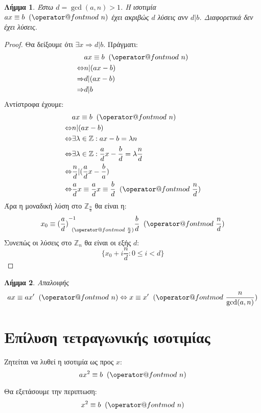 \documentclass[11pt,a4paper]{book}
\makeatletter
\newtheorem*{lemma}{Λήμμα}
\def\imod#1{\allowbreak\mkern10mu({\operator@font mod}\,\,#1)}
\makeatother
\begin{document}
\begin{lemma}
Έστω $d = \gcd( a, n ) > 1$. Η ισοτιμία $ax \equiv b \imod n$ έχει ακριβώς $d$ λύσεις ανν $d|b$. Διαφορετικά δεν έχει λύσεις.
\end{lemma}
\begin{proof}
Θα δείξουμε ότι $\exists x \Rightarrow d|b$. Πράγματι:
\begin{align*}
& ax \equiv b \imod n \\
\Leftrightarrow & n | (ax - b)\\
\Rightarrow & d|(ax-b)\\
\Rightarrow & d|b
\end{align*}
Αντίστροφα έχουμε:
\begin{align*}
& ax \equiv b \imod n\\
\Leftrightarrow & n | (ax - b)\\
\Leftrightarrow & \exists \lambda \in \mathbb{Z}: ax - b = \lambda n\\
\Leftrightarrow & \exists \lambda \in \mathbb{Z}: \frac{a}{d}x - \frac{b}{d} = \lambda\frac{n}{d} \\
\Leftrightarrow & \frac{n}{d} | (\frac{a}{d}x - \frac{b}{a}) \\
\Leftrightarrow & \frac{a}{d}x \equiv \frac{a}{d}x \equiv \frac {b}{d} \imod{\frac{n}{d}}
\end{align*}
Άρα η μοναδική λύση στο $\mathbb{Z}_{\frac{n}{d}}$ θα είναι η:
\[
x_0 \equiv {(\frac{a}{d})}^{-1}_{\imod {\frac{n}{d}}} \frac{b}{d} \imod{\frac{n}{d}}
\]
Συνεπώς οι λύσεις στο $\mathbb{Z}_n$ θα είναι οι εξής $d$:
\[
\{x_0 + i\frac{n}{d}: 0 \leq i < d \}
\]
\end{proof}

\begin{lemma}
Απαλοιφής
\[
ax \equiv ax' \imod n \Leftrightarrow x \equiv x' \imod {\frac{n}{\gcd(a, n)}}
\]
\end{lemma}

\section*{Επίλυση τετραγωνικής ισοτιμίας}

Ζητείται να λυθεί η ισοτιμία ως προς $x$:
\[
ax^2 \equiv b \imod n
\]

Θα εξετάσουμε την περιπτωση:
\[
x^2 \equiv b \imod n
\]
\end{document}
